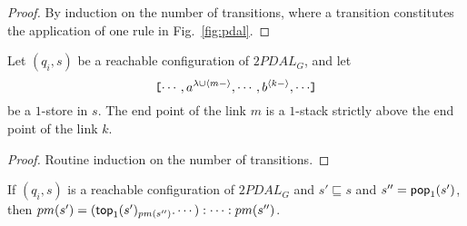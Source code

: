 \begin{proof} By induction on the number of transitions, where a
transition constitutes the application of one rule in
Fig.~\ref{fig:pdal}.
\end{proof}


\begin{lemma}\label{lem:order}
Let $(q_i, s)$ be a reachable configuration of $2PDAL_G$, and let
\[ \hbox{\tt [}{\cdots,
a^{\lambda \cup \langle m- \rangle}, \cdots , {b}^{\langle{k-}\rangle},
\cdots}\hbox{\tt ]}\] be a $1$-store in $s$. The end point of the link $m$ is
a $1$-stack strictly above the end point of the link $k$.
\end{lemma}

\begin{proof} Routine induction on the number of
transitions.
\end{proof}

\begin{lemma} \label{lem:pmpop} If $(q_i, s)$ is a reachable
configuration of $2PDAL_G$ and $s' \sqsubseteq s$ and $s'' =
{\sf pop}_1(s')$, then $pm(s') = ({\sf top}_1(s')_{pm(s'')} . \cdots):
\cdots : pm(s'')$.
\end{lemma}

